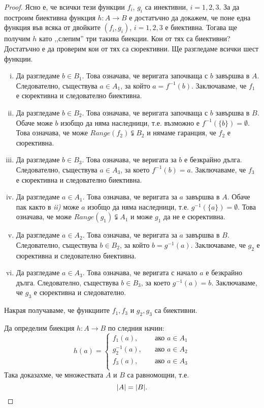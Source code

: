\begin{proof}
Ясно е, че всички тези функции $f_i$, $g_i$ са инективни, $i = 1,2,3$.
За да построим биективна функция $h:A\to B$ е достатъчно да докажем, че 
поне една функция във всяка от двойките $(f_i,g_i)$, $i = 1,2,3$ е биективна.
Тогава ще получим $h$ като ,,слепим'' три такива биекции.
Кои от тях са биективни? Достатъчно е да проверим кои от тях са сюрективни.
Ще разгледаме всички шест функции.
\begin{enumerate}[i)]
\item 
  Да разгледаме $b \in B_1$. Това означава, че веригата започваща с $b$
  завършва в $A$. Следователно, съществува 
  $a \in A_1$, за който $a = f^{-1}(b)$.
  Заключаваме, че $f_1$ е сюрективна и следователно биективна.
\item
  Да разгледаме $b \in B_2$. Това означава, че веригата започваща с $b$
  завършва в $B$.
  Обаче може $b$ изобщо да няма наследници, т.е.
  възможно е $f^{-1}(\{b\}) = \emptyset$.
  Това означава, че може $Range(f_2) \subsetneqq B_2$ и
  нямаме гаранция, че $f_2$ е сюрективна.
\item
  Да разгледаме $b \in B_3$. Това означава, че веригата за $b$
  е безкрайно дълга.
  Следователно, съществува $a \in A_3$, за което $f^{-1}(b) = a$.
  Заключаваме, че $f_3$ е сюрективна и следователно биективна.
\item
  Да разгледаме $a \in A_1$. Това означава, че веригата за $a$
  завършва в $A$. 
  Обаче пак както в {\em ii)} може $a$ изобщо да няма наследници, т.е.
  $g^{-1}(\{a\}) = \emptyset$.
  Това означава, че може $Range(g_1) \subsetneqq A_1$ и 
  може $g_1$ да не е сюрективна.
\item
  Да разгледаме $a \in A_2$. Това означава, че веригата за $a$ завършва в  $B$.
  Следователно, съществува $b \in B_2$, за който $b = g^{-1}(a)$.
  Заключаваме, че $g_2$ е сюрективна и следователно биективна.
\item
  Да разгледаме $a \in A_3$. Това означава, че веригата с начало $a$ е безкрайно дълга.
  Следователно, съществува $b \in B_3$, за което $g^{-1}(a) = b$.
  Заключаваме, че $g_3$ е сюрективна и следователно.
\end{enumerate}

Накрая получаваме, че функциите $f_1,f_3$ и $g_2,g_3$ са биективни.

Да определим биекция $h:A\rightarrow B$ по следния начин:
\[
h(a) =
\begin{cases}
  f_1(a),     & \quad \text{ако $a\in A_1$}\\
  g^{-1}_2(a), & \quad \text{ако $a\in A_2$}\\
  f_3(a),     & \quad \text{ако $a\in A_3$}\\
\end{cases}
\]
Така доказахме, че множествата $A$ и $B$ са равномощни, т.е.
\[\lvert{A}\rvert = \lvert{B}\rvert.\]
\end{proof}

